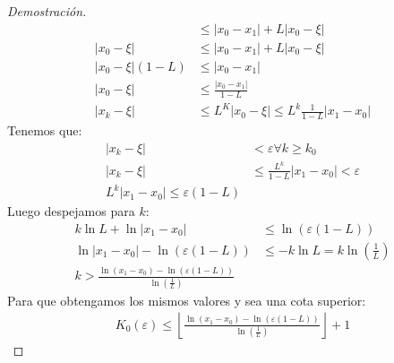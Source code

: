 \documentclass{article}
\begin{document}
\begin{proof}[Demostración]
\begin{equation}
\begin{split}
            &\leq \lvert x_{0}-x_{1} \rvert  +L\lvert x_{0}-\xi  \rvert\\
            \lvert x_{0}-\xi  \rvert &\leq \lvert x_{0}-x_{1} \rvert + L\lvert x_{0}-\xi  \rvert\\
            \lvert x_{0}-\xi \rvert (1-L) &\leq \lvert x_{0}-x_{1} \rvert \\ 
            \lvert x_{0}-\xi  \rvert &\leq \frac{\lvert x_{0}-x_{1} \rvert }{1-L}\\
            \lvert x_{k}-\xi  \rvert &\leq L^{K}\lvert x_{0}-\xi  \rvert \leq L^{k} \frac{1}{1-L}
            \lvert x_{1}-x_{0} \rvert   
        \end{split}
    \end{equation}
    Tenemos que:
    \begin{equation}
        \begin{split}
            \lvert x_{k}-\xi  \rvert &< \varepsilon \forall k \geq k_{0}\\
            \lvert x_{k}-\xi  \rvert&\leq \frac{L^{k}}{1-L}\lvert x_{1}-x_{0} \rvert<\varepsilon\\
            L^{k}\lvert x_{1}-x_{0} \rvert \leq \varepsilon (1-L)
        \end{split}
    \end{equation}
    Luego despejamos para $k$:
    \begin{equation}
        \begin{split}
            k \ln L + \ln \lvert x_{1}-x_{0} \rvert &\leq \ln(\varepsilon (1-L))\\
            \ln \lvert x_{1}-x_{0} \rvert - \ln (\varepsilon (1-L)) &\leq -k \ln L = k \ln (\frac{1}{L})\\
            k > \frac{\ln(x_{1}-x_{0})-\ln (\varepsilon (1-L))}{\ln (\frac{1}{L})}
        \end{split}
    \end{equation}
    Para que obtengamos los mismos valores y sea una cota superior:
    \begin{equation}
        \begin{split}
            K_{0}(\varepsilon ) \leq \left \lfloor{\frac{\ln(x_{1}-x_{0})-\ln (\varepsilon (1-L))}
            {\ln (\frac{1}{L})}}\right \rfloor +1
        \end{split}
    \end{equation}
\end{proof}
\end{document}
